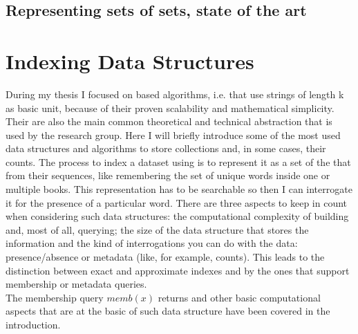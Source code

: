 \subsection{Representing sets of \kmer sets, state of the art}
\section{Indexing Data Structures}
During my thesis I focused on \kmer based algorithms, i.e. that use strings of length k as basic unit, because of their proven scalability and mathematical simplicity. Their are also the main common theoretical and technical abstraction that is used by the research group.  
Here I will briefly introduce some of the most used data structures and algorithms to store collections \kmers and, in some cases, their counts. The process to index a dataset using \kmers is to represent it as a set of the \kmers that from their sequences, like remembering the set of unique words inside one or multiple books. This representation has to be searchable so then I can interrogate it for the presence of a particular word.  There are three aspects to keep in count when considering such data structures: the computational complexity of building and, most of all, querying; the size of the data structure that stores the information and the kind of interrogations you can do with the data: presence/absence or metadata (like, for example, counts). This leads to the distinction between exact and approximate indexes and by the ones that support membership or metadata queries.\\
The membership query $memb(x)$ returns \kmers and other basic computational aspects that are at the basic of such data structure have been covered in the introduction.
